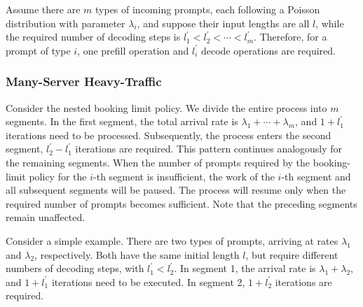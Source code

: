 \documentclass[opre, nonblindrev]{informs3} %
\begin{document}
Assume there are $ m $ types of incoming prompts, each following a Poisson distribution with parameter $\lambda_i$, and suppose their input lengths are all $ l $, while the required number of decoding steps is $ l^{\prime}_1 < l^{\prime}_2 < \cdots < l^{\prime}_{m}$. Therefore, for a prompt of type $i$, one prefill operation and $l^{\prime}_i$ decode operations are required.

\subsubsection{Many-Server Heavy-Traffic}
Consider the nested booking limit policy. We divide the entire process into $m$ segments. In the first segment, the total arrival rate is $\lambda_1 + \cdots + \lambda_m$, and $1 + l^{\prime}_1$ iterations need to be processed. Subsequently, the process enters the second segment, $l^{\prime}_2-l^{\prime}_1$ iterations are required. This pattern continues analogously for the remaining segments. When the number of prompts required by the booking-limit policy for the $i$-th segment is insufficient, the work of the $i$-th segment and all subsequent segments will be paused. The process will resume only when the required number of prompts becomes sufficient. Note that the preceding segments remain unaffected.

Consider a simple example. There are two types of prompts, arriving at rates $\lambda_1$ and $\lambda_2$, respectively. Both have the same initial length $l$, but require different numbers of decoding steps, with $l^{\prime}_1 < l^{\prime}_2$. In segment 1, the arrival rate is $\lambda_1 + \lambda_2$, and $1 + l^{\prime}_1$ iterations need to be executed. In segment 2, $1 + l^{\prime}_2$ iterations are required. 
\end{document}
